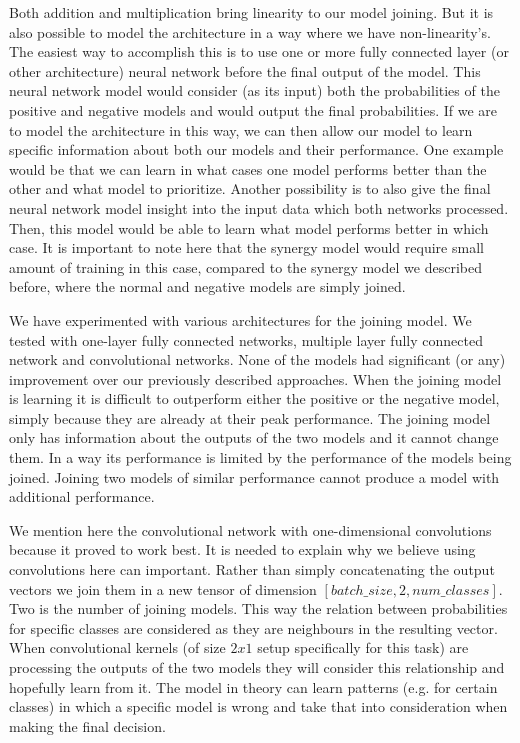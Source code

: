 \documentclass[b5paper]{book}
\begin{document}
Both addition and multiplication bring linearity to our model joining. But it is also possible to model the architecture in a way where we have non-linearity's. The easiest way to accomplish this is to use one or more fully connected layer (or other architecture) neural network before the final output of the model. This neural network model would consider (as its input) both the probabilities of the positive and negative models and would output the final probabilities. If we are to model the architecture in this way, we can then allow our model to learn specific information about both our models and their performance. One example would be that we can learn in what cases one model performs better than the other and what model to prioritize. Another possibility is to also give the final neural network model insight into the input data which both networks processed. Then, this model would be able to learn what model performs better in which case. It is important to note here that the synergy model would require small amount of training in this case, compared to the synergy model we described before, where the normal and negative models are simply joined.

We have experimented with various architectures for the joining model. We tested with one-layer fully connected networks, multiple layer fully connected network and convolutional networks. None of the models had significant (or any) improvement over our previously described approaches. When the joining model is learning it is difficult to outperform either the positive or the negative model, simply because they are already at their peak performance. The joining model only has information about the outputs of the two models and it cannot change them. In a way its performance is limited by the performance of the models being joined. Joining two models of similar performance cannot produce a model with additional performance.

We mention here the convolutional network with one-dimensional convolutions because it proved to work best. It is needed to explain why we believe using convolutions here can important. Rather than simply concatenating the output vectors we join them in a new tensor of dimension \( [batch\_size, 2, num\_classes] \). Two is the number of joining models. This way the relation between probabilities for specific classes are considered as they are neighbours in the resulting vector. When convolutional kernels (of size \( 2 x 1 \) setup specifically for this task) are processing the outputs of the two models they will consider this relationship and hopefully learn from it. The model in theory can learn patterns (e.g. for certain classes) in which a specific model is wrong and take that into consideration when making the final decision. 
\end{document}
